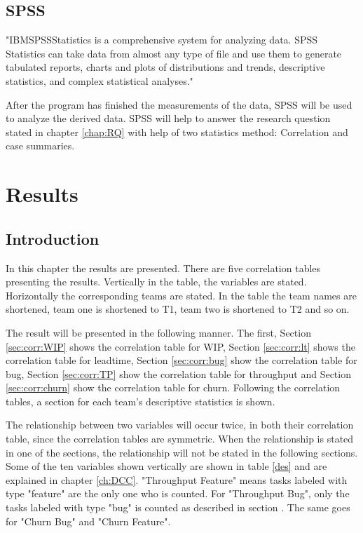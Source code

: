 \documentclass[UKenglish]{ifimaster}  %
\begin{document}
\section{SPSS}
\label{sec:SPSS}
"IBM\circledR  SPSS\circledR Statistics is a comprehensive system for analyzing data. SPSS Statistics can take data from almost any type of file and use them to generate tabulated reports, charts and plots of distributions and trends, descriptive statistics, and complex statistical analyses." \parencite{IBM}

After the program has finished the measurements of the data, SPSS will be used to analyze the derived data. SPSS will help to answer the research question stated in chapter \ref{chap:RQ} with help of two statistics method: Correlation and case summaries. 





\chapter{Results}                     %
\label{ch:res}
\section{Introduction}
In this chapter the results are presented. There are five correlation tables presenting the results. Vertically in the table, the variables are stated. Horizontally the corresponding teams are stated. In the table the team names are shortened, team one is shortened to T1, team two is shortened to T2 and so on. 

The result will be presented in the following manner. The first, Section \ref{sec:corr:WIP} shows the correlation table for WIP, Section \ref{sec:corr:lt} shows the correlation table for leadtime, Section \ref{sec:corr:bug} show the correlation table for bug, Section \ref {sec:corr:TP} show the correlation table for throughput and Section \ref {sec:corr:churn} show the correlation table for churn. Following the correlation tables, a section for each team's descriptive statistics  is shown.  


The relationship between two variables will occur twice, in both their correlation table, since the correlation tables are symmetric. When the relationship is stated in one of the sections, the relationship will not be stated in the following sections. Some of the ten variables shown vertically are shown in table \ref{des} and are explained in chapter \ref{ch:DCC}. "Throughput Feature" means tasks labeled with type "feature" are the only one who is counted. For "Throughput Bug", only the tasks labeled with type "bug" is counted as described in section . The same goes for "Churn Bug" and "Churn Feature". 
\end{document}
